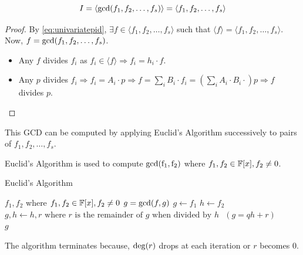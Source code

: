 \documentclass[a4paper,11pt]{article}
\begin{document}
\begin{prop}{\label{eq:gcdgenerator}}
    \begin{equation}
        I = \langle\operatorname{gcd}(f_1,f_2,\ldots,f_s)\rangle=\langle f_1,f_2,\ldots,f_s\rangle
    \end{equation}
\end{prop}
\begin{proof}
    By \ref{eq:univariatepid}, $\exists f\in\langle f_1,f_2,\ldots,f_s\rangle$ such that $\langle f\rangle = \langle f_1,f_2,\ldots,f_s\rangle$. Now, $f=\operatorname{gcd}(f_1,f_2,\ldots,f_s)$.
    \begin{itemize}
        \item Any $f$ divides $f_i$ as $f_i\in \langle f\rangle\Rightarrow f_i = h_i\cdot f$.
        \item Any $p$ divides $f_i\Rightarrow f_i = A_i\cdot p\Rightarrow f = \sum_{i}B_i \cdot f_i = \left(\displaystyle\sum_{i}A_i\cdot B_i \cdot\right) p \Rightarrow f$ divides $p$.
    \end{itemize}
\end{proof}
This GCD can be computed by applying Euclid's Algorithm successively to pairs of $f_1,f_2,\ldots,f_s$.
\begin{prop}{\label{algo:euclidgcd}}
    Euclid's Algorithm is used to compute $\operatorname{gcd(f_1,f_2)}$ where $f_1,f_2 \in\mathbb{F}[x], f_2\neq0$.
    \begin{center}
        \begin{algorithm}
        \caption{Euclid's Algorithm}\label{alg:euclidgcd}
        \begin{algorithmic}
        \Require $f_1,f_2$ where $f_1,f_2 \in\mathbb{F}[x], f_2\neq0$
        \Ensure $g=\operatorname{gcd}(f,g)$
        \State $g \gets f_1$
        \State $h \gets f_2$
        \State $g,h \gets h, r \text{ where $r$ is the remainder of $g$ when divided by $h$ }(g=qh+r)$
        \EndWhile \\ 
        \Return $g$
        \end{algorithmic}
        \end{algorithm}
    \end{center}
    The algorithm terminates because, $\operatorname{deg}(r)$ drops at each iteration or $r$ becomes $0$.
\end{prop}
\end{document}
